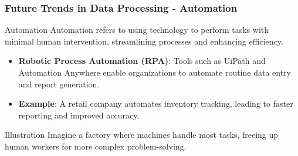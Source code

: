 \documentclass{beamer}
\begin{document}
\begin{frame}[fragile]
    \frametitle{Future Trends in Data Processing - Automation}
    \begin{block}{Automation}
        Automation refers to using technology to perform tasks with minimal human intervention, streamlining processes and enhancing efficiency.
    \end{block}
    
    \begin{itemize}
        \item \textbf{Robotic Process Automation (RPA)}: Tools such as UiPath and Automation Anywhere enable organizations to automate routine data entry and report generation.
        \item \textbf{Example}: A retail company automates inventory tracking, leading to faster reporting and improved accuracy.
    \end{itemize}
    
    \begin{block}{Illustration}
        Imagine a factory where machines handle most tasks, freeing up human workers for more complex problem-solving.
    \end{block}
\end{frame}
\end{document}
